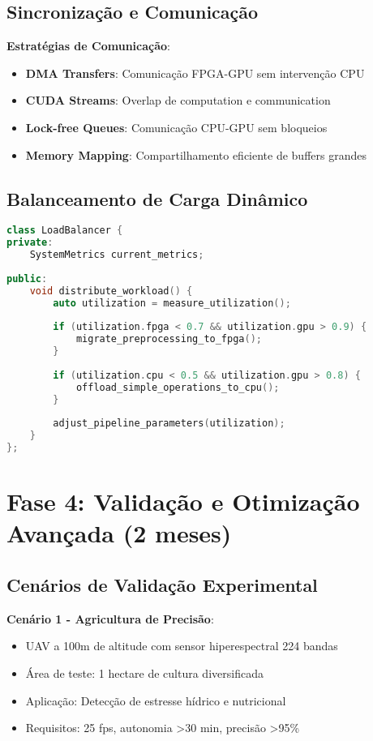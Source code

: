 \subsection{Sincronização e Comunicação}

\textbf{Estratégias de Comunicação}:
\begin{itemize}
\item \textbf{DMA Transfers}: Comunicação FPGA-GPU sem intervenção CPU
\item \textbf{CUDA Streams}: Overlap de computation e communication
\item \textbf{Lock-free Queues}: Comunicação CPU-GPU sem bloqueios
\item \textbf{Memory Mapping}: Compartilhamento eficiente de buffers grandes
\end{itemize}

\subsection{Balanceamento de Carga Dinâmico}

\begin{lstlisting}[language=cpp, caption=Balanceamento Dinâmico]
class LoadBalancer {
private:
    SystemMetrics current_metrics;
    
public:
    void distribute_workload() {
        auto utilization = measure_utilization();
        
        if (utilization.fpga < 0.7 && utilization.gpu > 0.9) {
            migrate_preprocessing_to_fpga();
        }
        
        if (utilization.cpu < 0.5 && utilization.gpu > 0.8) {
            offload_simple_operations_to_cpu();
        }
        
        adjust_pipeline_parameters(utilization);
    }
};
\end{lstlisting}

\section{Fase 4: Validação e Otimização Avançada (2 meses)}

\subsection{Cenários de Validação Experimental}

\textbf{Cenário 1 - Agricultura de Precisão}:
\begin{itemize}
\item UAV a 100m de altitude com sensor hiperespectral 224 bandas
\item Área de teste: 1 hectare de cultura diversificada
\item Aplicação: Detecção de estresse hídrico e nutricional
\item Requisitos: 25 fps, autonomia >30 min, precisão >95\%
\end{itemize}

